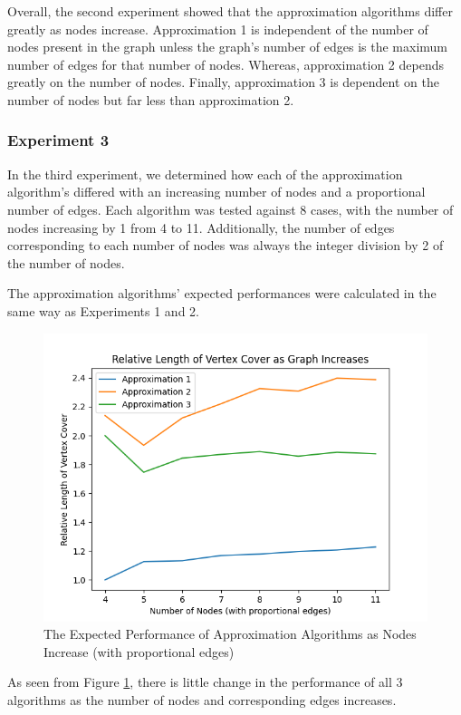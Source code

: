 \documentclass[titlepage]{article}
\begin{document}
Overall, the second experiment showed that the approximation algorithms differ greatly as nodes increase. Approximation 1 is independent of the number of nodes present in the graph unless the graph's number of edges is the maximum number of edges for that number of nodes. Whereas, approximation 2 depends greatly on the number of nodes. Finally, approximation 3 is dependent on the number of nodes but far less than approximation 2.

\subsubsection{Experiment 3}

In the third experiment, we determined how each of the approximation algorithm's differed with an increasing number of nodes and a proportional number of edges. Each algorithm was tested against 8 cases, with the number of nodes increasing by 1 from 4 to 11. Additionally, the number of edges corresponding to each number of nodes was always the integer division by 2 of the number of nodes.

The approximation algorithms' expected performances were calculated in the same way as Experiments 1 and 2.

\begin{figure}[H]
    \centering
    \includegraphics[width=0.8\linewidth]{experiment_3_3.png}
    \caption{The Expected Performance of Approximation Algorithms as Nodes Increase (with proportional edges)}
    \label{fig:experiment_3_3}
\end{figure}

As seen from Figure \ref{fig:experiment_3_3}, there is little change in the performance of all 3 algorithms as the number of nodes and corresponding edges increases.
\end{document}
